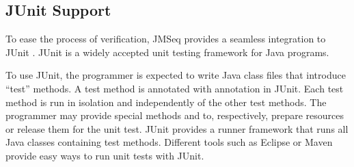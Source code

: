 \subsection{JUnit Support} \label{ch05:sec:junit}
To ease the process of verification, JMSeq provides a seamless integration to JUnit \cite{JUnit}. 
JUnit is a widely accepted unit testing framework for Java programs.

To use JUnit, the programmer is expected to write Java class files that introduce ``test'' methods.
A test method is annotated with  annotation in JUnit.
Each test method is run in isolation and independently of the other test methods.
The programmer may provide special methods  and  to, respectively, prepare resources or release them for the unit test.
JUnit provides a runner framework that runs all Java classes containing test methods.
Different tools such as Eclipse \cite{eclipse_junit} or Maven \cite{maven_junit} provide easy ways to run unit tests with JUnit.

